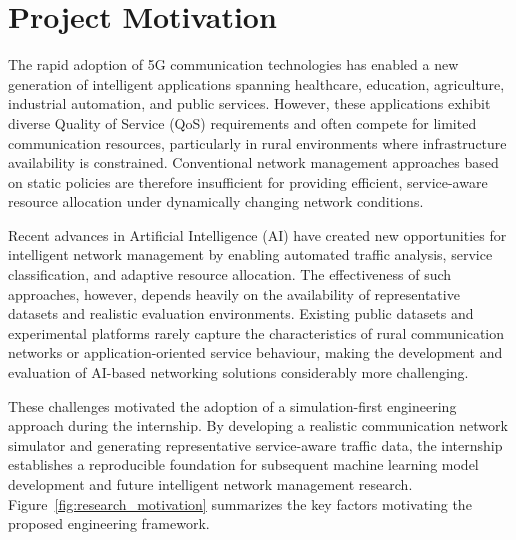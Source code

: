 \documentclass[12pt,a4paper]{report}
\begin{document}
	\section{Project Motivation}
	\label{sec:research_motivation}
	
	The rapid adoption of 5G communication technologies has enabled a new generation of intelligent applications spanning healthcare, education, agriculture, industrial automation, and public services. However, these applications exhibit diverse Quality of Service (QoS) requirements and often compete for limited communication resources, particularly in rural environments where infrastructure availability is constrained. Conventional network management approaches based on static policies are therefore insufficient for providing efficient, service-aware resource allocation under dynamically changing network conditions.
	
	Recent advances in Artificial Intelligence (AI) have created new opportunities for intelligent network management by enabling automated traffic analysis, service classification, and adaptive resource allocation. The effectiveness of such approaches, however, depends heavily on the availability of representative datasets and realistic evaluation environments. Existing public datasets and experimental platforms rarely capture the characteristics of rural communication networks or application-oriented service behaviour, making the development and evaluation of AI-based networking solutions considerably more challenging.
	
	These challenges motivated the adoption of a simulation-first engineering approach during the internship. By developing a realistic communication network simulator and generating representative service-aware traffic data, the internship establishes a reproducible foundation for subsequent machine learning model development and future intelligent network management research. Figure~\ref{fig:research_motivation} summarizes the key factors motivating the proposed engineering framework.
	
\end{document}
